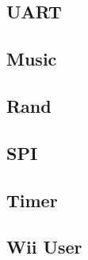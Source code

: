 {%
\subsection{UART}





\subsection{Music}





\subsection{Rand}





\subsection{SPI}





\subsection{Timer}





\subsection{Wii User}



}%
